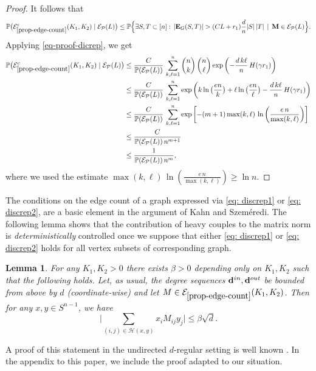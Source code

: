 \documentclass[12pt]{article}
\newtheorem{lemma}[theorem]{Lemma}
\theoremstyle{definition}
\theoremstyle{plain}
\newcommand{\Event}{\mathcal{E}}
\def\nrangr{G}
\def\ranmtx{{\bf{}M}}
\def\edg{{\bf E}_{\nrangr}}
\def\Prob{{\mathbb P}}
\def\InDeg{{\bf d}^{in}}
\def\OutDeg{{\bf d}^{out}}
\def\pvector{{\mathcal P}}
\begin{document}
\begin{proof}
It follows that
$$
\Prob\big(\Event_{\ref{prop-edge-count}}^c(K_1,K_2)\mid \Event_{\pvector}(L)\big)
\leq \Prob\Big\{\exists S, T\subset [n]:\, \vert\edg(S,T)\vert 
> (CL+ r_1) \frac{d}{n} |S|\, |T|\,\mid\,{\ranmtx}\in\Event_{\pvector}(L)
\Big\}.
$$
Applying \eqref{eq-proof-dicrep}, we get
\begin{align*}
\Prob\big(\Event_{\ref{prop-edge-count}}^c(K_1,K_2)\mid \Event_{\pvector}(L)\big)
&\leq \frac{C}{\Prob(\Event_\pvector(L))}\,\sum_{k,\ell=1}^n {n\choose k}\, {n\choose \ell} \exp\left(-\frac{d\, k\ell}{n}\, H(\gamma r_1)\right)\\
&\leq \frac{C}{\Prob(\Event_\pvector(L))}\,\sum_{k,\ell=1}^n
\exp\left(k\ln\big(\frac{en}{k}\big)+\ell\ln\big(\frac{en}{\ell}\big)-\frac{d\, k\ell}{n}\, H(\gamma r_1)\right)\\
&\leq \frac{C}{\Prob(\Event_\pvector(L))}\,\sum_{k,\ell=1}^n \exp\left[-(m+1)\max(k,\ell)\, \ln\left(\frac{e\, n}{\max(k,\ell)}\right)\right]\\
&\leq \frac{C}{\Prob(\Event_\pvector(L))\, n^{m+1}}\\
&\leq \frac{1}{\Prob(\Event_\pvector(L))\, n^{m}},
\end{align*}
where we used the estimate $\max(k,\ell)\, \ln\left(\frac{e\, n}{\max(k,\ell)}\right)\geq \ln n$.
\end{proof}

The conditions on the edge count of a graph expressed via \eqref{eq: discrep1} or \eqref{eq: discrep2},
are a basic element in the argument of Kahn and Szem\'eredi. The following 
lemma shows that the contribution of heavy couples to the matrix norm is {\it deterministically} controlled
once we suppose that either 
\eqref{eq: discrep1} or \eqref{eq: discrep2} holds for all vertex subsets of corresponding graph.

\begin{lemma}\label{lem-kahn-szemeredi}
For any $K_1,K_2>0$ there exists $\beta>0$ depending only on $K_1,K_2$ such that the following holds.  
Let, as usual, the degree sequences $\InDeg,\OutDeg$ be bounded from above by $d$ (coordinate-wise)
and let $M\in\Event_{\ref{prop-edge-count}}(K_1,K_2)$.
Then for any $x, y\in S^{n-1}$, we have
$$
\Big\vert\sum_{(i,j)\in \mathcal{H}(x,y)} x_i M_{ij} y_j \Big\vert\leq \beta \sqrt{d}.
$$
\end{lemma}
A proof of this statement in the undirected $d$-regular setting is well known \cite{FKS, CGJ}.
In the appendix to this paper, we include the proof adapted to our situation.

\bigskip
\end{document}
